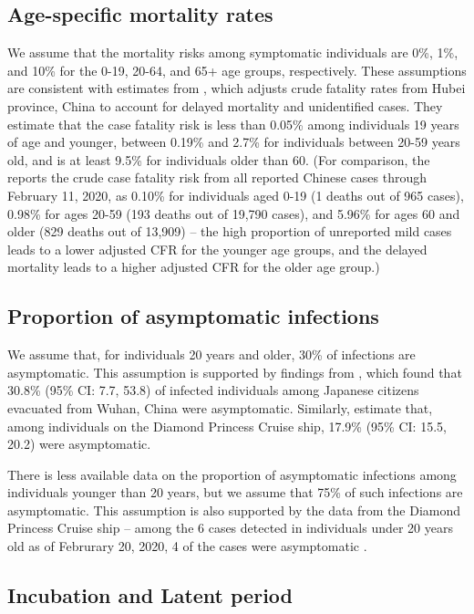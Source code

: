 \documentclass[12pt]{article}
\begin{document}
\subsection{Age-specific mortality rates}

We assume that the mortality risks among symptomatic individuals are 0\%, 1\%, and 10\% for the 0-19, 20-64, and 65+ age groups, respectively. These assumptions are consistent with estimates from \citet{riou_adjusted_2020}, which adjusts crude fatality rates from Hubei province, China to account for delayed mortality and unidentified cases. They estimate that the case fatality risk is less than 0.05\% among individuals 19 years of age and younger, between 0.19\% and 2.7\% for individuals between 20-59 years old, and is at least 9.5\% for individuals older than 60. (For comparison, the \citet{ChinaEpiWG} reports the crude case fatality risk from all reported Chinese cases through February 11, 2020, as 0.10\% for individuals aged 0-19 (1 deaths out of 965 cases), 0.98\% for ages 20-59 (193 deaths out of 19,790 cases), and 5.96\% for ages 60 and older (829 deaths out of 13,909) -- the high proportion of unreported mild cases leads to a lower adjusted CFR for the younger age groups, and the delayed mortality leads to a higher adjusted CFR for the older age group.)

\subsection{Proportion of asymptomatic infections}

We assume that, for individuals 20 years and older, 30\% of infections are asymptomatic. This assumption is supported by findings from \citet{nishiura2020}, which found that 30.8\% (95\% CI: 7.7, 53.8) of infected individuals among Japanese citizens evacuated from Wuhan, China were asymptomatic. Similarly, \citet{mizumoto_estimating_2020} estimate that, among individuals on the Diamond Princess Cruise ship, 17.9\% (95\% CI: 15.5, 20.2) were asymptomatic.

There is less available data on the proportion of asymptomatic infections among individuals younger than 20 years, but we assume that 75\% of such infections are asymptomatic. This assumption is also supported by the data from the Diamond Princess Cruise ship -- among the 6 cases detected in individuals under 20 years old as of Februrary 20, 2020, 4 of the cases were asymptomatic \citep{Russell2020}.

\subsection{Incubation and Latent period}
\end{document}
